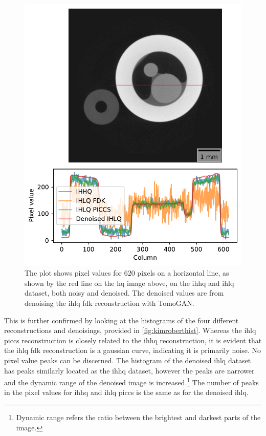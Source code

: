 \begin{figure}[htbp]
  \centering
  \includegraphics[width=.95\textwidth]{figures/kimrobertline.pdf}
  \caption[Pixel value plot of IHHQ and IHLQ, noisy and denoised]{The plot shows pixel values for 620 pixels on a horizontal line, as shown by the red line on the \gls{hq} image above, on the \gls{ihhq} and \gls{ihlq} dataset, both noisy and denoised. The denoised values are from denoising the \gls{ihlq} \gls{fdk} reconstruction with TomoGAN. }
  \label{fig:kimrobertline}
\end{figure}

This is further confirmed by looking at the histograms of the four different reconstructions and denoisings, provided in \cref{fig:kimroberthist}. Whereas the \gls{ihlq} \gls{piccs} reconstruction is closely related to the \gls{ihhq} reconstruction, it is evident that the \gls{ihlq} \gls{fdk} reconstruction is a gaussian curve, indicating it is primarily noise. No pixel value peaks can be discerned. The histogram of the denoised \gls{ihlq} dataset has peaks similarly located as the \gls{ihhq} dataset, however the peaks are narrower and the dynamic range of the denoised image is increased.\footnote{Dynamic range refers the ratio between the brightest and darkest parts of the image. } The number of peaks in the pixel values for \gls{ihhq} and \gls{ihlq} \gls{piccs} is the same as for the denoised \gls{ihlq}. 


